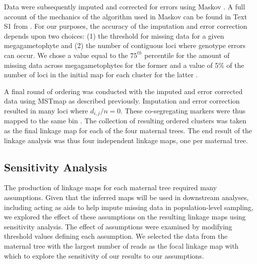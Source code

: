 \documentclass[11pt]{article}
\begin{document}
Data were subsequently imputed and corrected for errors using Maskov \citep{Ward:2013}. A full account of the mechanics of the algorithm 
used in Maskov can be found in Text S1 from \citet{Ward:2013}. For our purposes, the accuracy of the imputation and 
error correction depends upon two choices: (1) the threshold for missing data for a given megagametophyte and (2) the number of 
contiguous loci where genotype errors can occur. We chose a value equal to the $75^{th}$ percentile for the amount of 
missing data across megagametophytes for the former and a value of 5\% of the number of loci in the initial map for each 
cluster for the latter \citet[cf.][]{Ward:2013}.

A final round of ordering was conducted with the imputed and error corrected data using MSTmap as described previously. Imputation 
and error correction resulted in many loci where $d_{i,j}/n = 0$. These co-segregating markers were thus mapped to the same bin 
\citep[see][]{Wu:2008a}. The collection of resulting ordered clusters was taken as the final linkage map for each of the four maternal trees. 
The end result of the linkage analysis was thus four independent linkage maps, one per maternal tree.

\subsection*{Sensitivity Analysis}
The production of linkage maps for each maternal tree required many assumptions.
Given that the inferred maps will be used in downstream analyses, including acting as aids
to help impute missing data in population-level sampling, we explored the effect of these assumptions on 
the resulting linkage maps using sensitivity analysis. The effect of assumptions 
were examined by modifying threshold values defining each assumption. We selected the
data from the maternal tree with the largest number of reads as the focal linkage map with which to explore
the sensitivity of our results to our assumptions.
\end{document}
